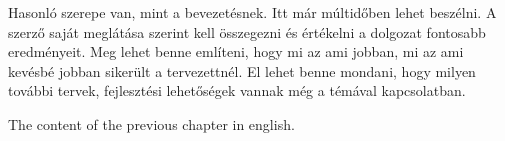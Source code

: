 

Hasonló szerepe van, mint a bevezetésnek.
Itt már múltidőben lehet beszélni.
A szerző saját meglátása szerint kell összegezni és értékelni a dolgozat fontosabb eredményeit.
Meg lehet benne említeni, hogy mi az ami jobban, mi az ami kevésbé jobban sikerült a tervezettnél.
El lehet benne mondani, hogy milyen további tervek, fejlesztési lehetőségek vannak még a témával kapcsolatban.



The content of the previous chapter in english.